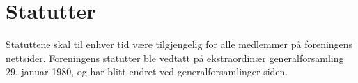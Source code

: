 \section{Statutter}
Statuttene skal til enhver tid være tilgjengelig for alle medlemmer på
foreningens nettsider. Foreningens statutter ble vedtatt på ekstraordinær
generalforsamling 29. januar 1980, og har blitt endret ved generalforsamlinger
siden.
